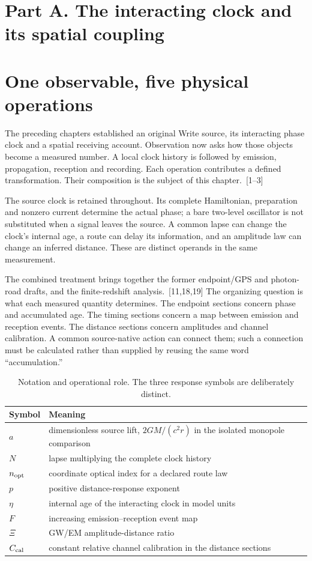 \documentclass[10pt,twocolumn,letterpaper]{article}
\begin{document}
\section*{Part A. The interacting clock and its spatial coupling}

\section{One observable, five physical operations}
The preceding chapters established an original Write source, its interacting phase clock and a spatial receiving account. Observation now asks how those objects become a measured number. A local clock history is followed by emission, propagation, reception and recording. Each operation contributes a defined transformation. Their composition is the subject of this chapter.~[1--3]

The source clock is retained throughout. Its complete Hamiltonian, preparation and nonzero current determine the actual phase; a bare two-level oscillator is not substituted when a signal leaves the source. A common lapse can change the clock's internal age, a route can delay its information, and an amplitude law can change an inferred distance. These are distinct operands in the same measurement.

The combined treatment brings together the former endpoint/GPS and photon-road drafts, and the finite-redshift analysis.~[11,18,19] The organizing question is what each measured quantity determines. The endpoint sections concern phase and accumulated age. The timing sections concern a map between emission and reception events. The distance sections concern amplitudes and channel calibration. A common source-native action can connect them; such a connection must be calculated rather than supplied by reusing the same word ``accumulation.''

\begin{table}[htbp]\centering\small
\caption{Notation and operational role. The three response symbols are deliberately distinct.}
\begin{tabularx}{\columnwidth}{@{}l>{\raggedright\arraybackslash}X@{}}\toprule
Symbol & Meaning\\\midrule
$a$ & dimensionless source lift, $2GM/(c^2r)$ in the isolated monopole comparison\\
$N$ & lapse multiplying the complete clock history\\
$n_{\rm opt}$ & coordinate optical index for a declared route law\\
$p$ & positive distance-response exponent\\
$\eta$ & internal age of the interacting clock in model units\\
$F$ & increasing emission--reception event map\\
$\Xi$ & GW/EM amplitude-distance ratio\\
$C_{\rm cal}$ & constant relative channel calibration in the distance sections\\\bottomrule
\end{tabularx}\end{table}
\end{document}
